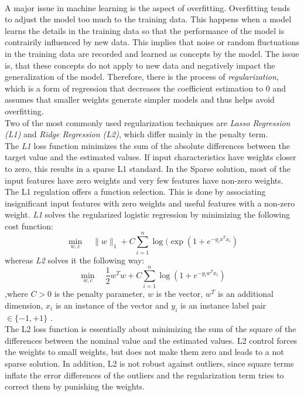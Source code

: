 \documentclass[a4paper, 11pt,titlepage,oneside,openany]{book}
\begin{document}
\\ A major issue in machine learning is the aspect of overfitting. Overfitting tends to adjust the model too much to the training data. This happens when a model learns the details in the training data so that the performance of the model is contrairily influenced by new data. This implies that noise or random fluctuations in the training data are recorded and learned as concepts by the model. The issue is, that these concepts do not apply to new data and negatively impact the generalization of the model. Therefore, there is the process of \textit{regularization}, which is a form of regression that decreases the coefficient estimation to $0$ and assumes that smaller weights generate simpler models and thus helps avoid overfitting. \\
\noindent Two of the most commonly used regularization techniques are \textit{Lasso Regression (L1)} and \textit{Ridge Regression (L2)}, which differ mainly in the penalty term. \\
\noindent The \textit{L1} loss function minimizes the sum of the absolute differences between the target value and the estimated values. If input characteristics have weights closer to zero, this results in a sparse L1 standard. In the Sparse solution, most of the input features have zero weights and very few features have non-zero weights. The L1 regulation offers a function selection. This is done by associating insignificant input features with zero weights and useful features with a non-zero weight. 
\newpage 
\noindent \textit{L1} solves the regularized logistic regression by minimizing the following cost function:
\[
\min_{w, c} \quad \|w\|_1 + C \sum_{i=1}^n \log(\exp(1+e^{-y_ix^Tx_i})
\]
whereas \textit{L2} solves it the following way:
\[
\min_{w, c} \quad \frac{1}{2}w^T w + C \sum_{i=1}^n \log(1+e^{-y_iw^Tx_i})
\]
,where $C>0$ is the penalty parameter, $w$ is the vector, $w^T$ is an additional dimension, $x_i$ is an instance of the vector and $y_i$ is an instance label pair $\in \{-1,+1\}$ \cite{liblinear}.\\
The L2 loss function is essentially about minimizing the sum of the square of the differences between the nominal value and the estimated values.
L2 control forces the weights to small weights, but does not make them zero and leads to a not sparse solution. In addition, L2 is not robust against outliers, since square terms inflate the error differences of the outliers and the regularization term tries to correct them by punishing the weights.
\end{document}
